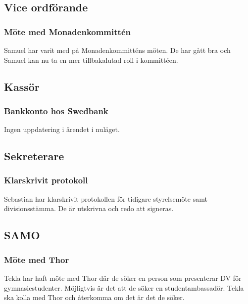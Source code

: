 \documentclass[protokoll]{dvd}
\begin{document}
\newpage

\subsection{Vice ordförande}


\subsubsection{Möte med Monadenkommittén}
Samuel har varit med på Monadenkommitténs möten. De har gått bra och Samuel kan nu ta en mer tillbakalutad roll i kommittéen.






\newpage

\subsection{Kassör}

\subsubsection{Bankkonto hos Swedbank}

\begin{description}[style=multiline, widest=00.00, align=left, leftmargin=2.5cm]
    \item[2021-10-11] Ingen uppdatering i ärendet i nuläget.
\end{description}




\subsection{Sekreterare}

\subsubsection{Klarskrivit protokoll}
Sebastian har klarskrivit protokollen för tidigare styrelsemöte samt divisionsstämma. De är utskrivna och redo att signeras.



\subsection{SAMO}

\subsubsection{Möte med Thor}
Tekla har haft möte med Thor där de söker en person som presenterar DV för gymnasiestudenter.
Möjligtvis är det att de söker en studentambassadör. Tekla ska kolla med Thor och återkomma om det är det de söker.
\end{document}
